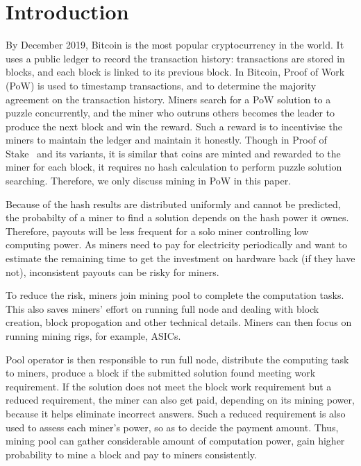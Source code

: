 \section{Introduction}
\label{sec:intro}

By December 2019, Bitcoin is the most popular cryptocurrency in the world.
It uses a public ledger to record the transaction history: transactions are stored in blocks, and each block is linked to its previous block.
In Bitcoin, Proof of Work (PoW) is used to timestamp transactions, and to determine the majority agreement on the transaction history.
Miners search for a PoW solution to a puzzle concurrently, and the miner who outruns others becomes the leader to produce the next block and win the reward.
Such a reward is to incentivise the miners to maintain the ledger and maintain it honestly.
Though in Proof of Stake~\cite{} and its variants, it is similar that coins are minted and rewarded to the miner for each block, it requires no hash calculation to perform puzzle solution searching.
Therefore, we only discuss mining in PoW in this paper.

Because of the hash results are distributed uniformly and cannot be predicted, the probabilty of a miner to find a solution depends on the hash power it ownes.
Therefore, payouts will be less frequent for a solo miner controlling low computing power.
As miners need to pay for electricity periodically and want to estimate the remaining time to get the investment on hardware back (if they have not), inconsistent payouts can be risky for miners.

To reduce the risk, miners join mining pool to complete the computation tasks.
This also saves miners' effort on running full node and dealing with block creation, block propogation and other technical details.
Miners can then focus on running mining rigs, for example, ASICs.

Pool operator is then responsible to run full node, distribute the computing task to miners, 
produce a block if the submitted solution found meeting work requirement.
If the solution does not meet the block work requirement but a reduced requirement, the miner can also get paid, depending on its mining power, because it helps eliminate incorrect answers.
Such a reduced requirement is also used to assess each miner's power, so as to decide the payment amount.
Thus, mining pool can gather considerable amount of computation power, gain higher probability to mine a block and pay to miners consistently.

